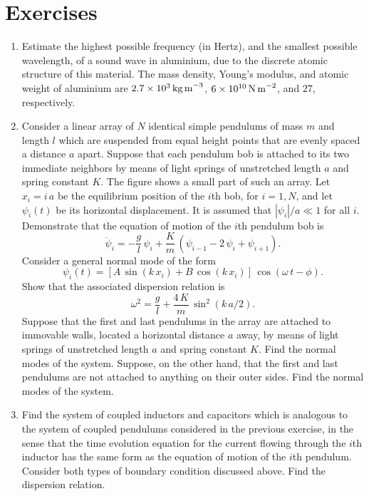 \section{Exercises}
{\small
\begin{enumerate}
\item Estimate the highest possible frequency (in Hertz), and the smallest possible wavelength, of a sound wave in aluminium,  due to the discrete atomic structure of this material. The mass density, Young's modulus, and atomic weight
of aluminium are $2.7\times 10^3\,{\rm kg\,m}^{-3}$, $6\times 10^{10}\,{\rm N\,m}^{-2}$, and
$27$, respectively. 


\item Consider a linear array of $N$ identical simple pendulums of mass $m$ and
length $l$ which are suspended from equal height points  that are evenly
spaced a distance $a$ apart. Suppose that each pendulum bob is attached to
its two immediate neighbors by means of light springs of unstretched
length $a$ and spring constant $K$. The figure shows a small part of
such an array. Let $x_i=i\,a$ be the equilibrium position of the $i$th bob, for
$i=1,N$, and let $\psi_i(t)$ be its horizontal displacement. It is assumed that $|\psi_i|/a\ll 1$ for
all $i$. Demonstrate that the equation of motion of the $i$th pendulum bob is
$$
\ddot{\psi}_i = - \frac{g}{l}\,\psi_i + \frac{K}{m}\,(\psi_{i-1}-2\,\psi_i+\psi_{i+1}).
$$
Consider a general normal mode of the form
$$
\psi_i(t) = [A\,\sin (k\,x_i)+ B\,\cos(k\,x_i)]\,\cos(\omega\,t-\phi).
$$
Show that the associated dispersion relation is
$$
\omega^2= \frac{g}{l} + \frac{4\,K}{m}\,\sin^2(k\,a/2).
$$
Suppose that the first and last pendulums in the array are attached to immovable
walls, located a horizontal distance $a$ away, by means of light springs of unstretched length $a$
and spring constant $K$. Find the normal modes of the system. 
Suppose, on the other hand, that the first and last pendulums are not attached to anything on their
outer sides. Find the normal modes of the system. 
\begin{figure}[h]
\epsfysize=2in
\centerline{}
\end{figure}

\item Find the system of coupled inductors and capacitors which is analogous 
to the system of coupled pendulums considered in the previous exercise, in the sense that
the time evolution equation for the current flowing through the $i$th inductor
has the same form as the equation of motion of the $i$th pendulum. Consider
both types of boundary condition discussed above. Find the
dispersion relation. 


\end{enumerate}}
